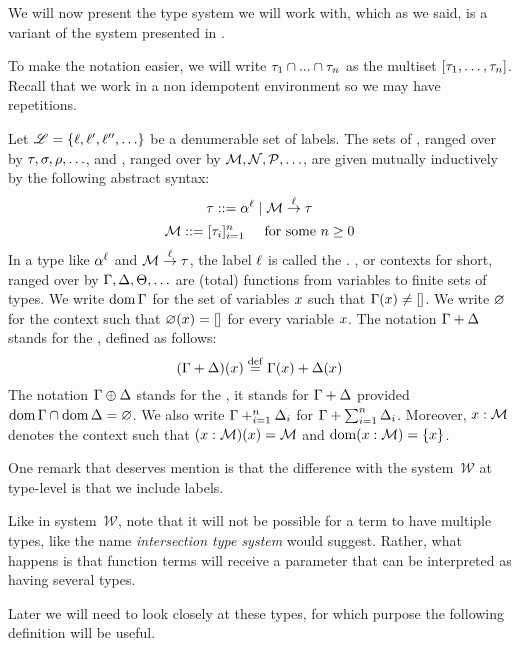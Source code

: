 We will now present the type system we will work with, which as we said, is a variant of the system presented
in \cite{bucciarelli2017non}.

To make the notation easier, we will write $\tau_1 \cap ... \cap \tau_n$ as the
multiset $[\tau_1, \hdots, \tau_n]$.
Recall that we work in a non idempotent environment so we may have repetitions.

\begin{definition}
Let $\mathscr{L} = \{\ell,\ell',\ell'',\hdots\}$ be a denumerable set of labels.
The sets of , ranged over by $\tau,\sigma,\rho,\hdots$,
and , ranged over by $\mathcal{M},\mathcal{N},\mathcal{P},\hdots$,
are given mutually inductively by the following abstract syntax:
\[
  \tau ::= \alpha^{\ell} \mid \mathcal{M} \overset{\ell}{\to} \tau
\]
\[
  \mathcal{M} ::= [\tau_i]_{i=1}^{n} \hspace{.5cm} \text{for some $n \geq 0$}
\]
In a type like $\alpha^{\ell}$ and $\mathcal{M} \overset{\ell}{\to} \tau$,
the label $\ell$ is called the .
, or contexts for short,
ranged over by $\Gamma,\Delta,\Theta,\hdots$ are (total) functions from variables to finite sets of types.
We write $\operatorname{dom}\Gamma$ for the set of variables $x$ such that $\Gamma(x) \neq []$.
We write $\varnothing$ for the context such that $\varnothing(x) = []$ for every variable $x$.
The notation $\Gamma + \Delta$ stands for the , defined as follows:
\[
    (\Gamma + \Delta)(x) \overset{\mathrm{def}}{=} \Gamma(x) + \Delta(x)
\]
The notation $\Gamma \oplus \Delta$ stands for the ,
\ie it stands for $\Gamma + \Delta$ provided $\operatorname{dom}\Gamma \cap \operatorname{dom}\Delta = \varnothing$.
We also write $\Gamma +_{i=1}^{n} \Delta_i$ for $\Gamma + \sum_{i=1}^{n} \Delta_i$.
Moreover, $x : \mathcal{M}$ denotes the context such that $(x : \mathcal{M})(x) = \mathcal{M}$
and $\operatorname{dom}(x : \mathcal{M}) = \{x\}$.
\end{definition}

One remark that deserves mention is that the difference with the system~$\mathcal{W}$
at type-level is that we include labels.

Like in system~$\mathcal{W}$, note that it will not be possible for a term to have multiple types,
like the name \textit{intersection type system} would suggest.
Rather, what happens is that function terms will receive a parameter that can be interpreted
as having several types.

Later we will need to look closely at these types,
for which purpose the following definition will be useful.


